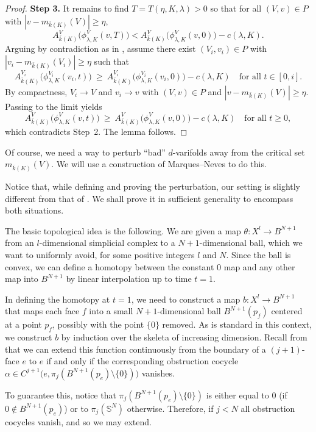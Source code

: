 \documentclass[12pt,english]{article}
\theoremstyle{definition}
\begin{document}
\begin{proof}
\textbf{Step 3.} It remains to find \(T=T(\eta,K,\lambda)>0\) so that for all \((V,v)\in P\) with \(|v-m_{\bar{k}(K)}(V)|\ge \eta\),
\[
A^V_{\bar{k}(K)}\bigl(\phi^V_{\lambda,K}(v,T)\bigr)
<
A^V_{\bar{k}(K)}\bigl(\phi^V_{\lambda,K}(v,0)\bigr)-c(\lambda,K).
\]
Arguing by contradiction as in \cite[Lemma~4.5]{MarquesNeves}, assume there exist \((V_i,v_i)\in P\) with \(|v_i-m_{\bar{k}(K)}(V_i)|\ge \eta\) such that
\[
A^{V_i}_{\bar{k}(K)}\bigl(\phi^{V_i}_{\lambda,K}(v_i,t)\bigr)
\ \ge\
A^{V_i}_{\bar{k}(K)}\bigl(\phi^{V_i}_{\lambda,K}(v_i,0)\bigr)-c(\lambda,K)
\quad\text{for all }t\in[0,i].
\]
By compactness, \(V_i\to V\) and \(v_i\to v\) with \((V,v)\in P\) and \(|v-m_{\bar{k}(K)}(V)|\ge \eta\). Passing to the limit yields
\[
A^{V}_{\bar{k}(K)}\bigl(\phi^{V}_{\lambda,K}(v,t)\bigr)
\ \ge\
A^{V}_{\bar{k}(K)}\bigl(\phi^{V}_{\lambda,K}(v,0)\bigr)-c(\lambda,K)
\quad\text{for all }t\ge 0,
\]
which contradicts Step~2. The lemma follows.
\end{proof}


Of course, we need a way to perturb ``bad'' $d$-varifolds away from the critical set $m_{\bar k (K)}(V)$. We will use a construction of Marques--Neves to do this.

Notice that, while defining and proving the perturbation, our setting is slightly different from that of \cite[Theorem~5.1]{MarquesNeves}. We shall prove it in sufficient generality to encompass both situations.

The basic topological idea is the following. We are given a map $\theta:X^l\rightarrow B^{N+1}$ from an $l$-dimensional simplicial complex to a $N+1$-dimensional ball, which we want to uniformly avoid, for some positive integers $l$ and $N$. Since the ball is convex, we can define a homotopy between the constant $0$ map and any other map into $B^{N+1}$ by linear interpolation up to time $t=1$.

In defining the homotopy at $t=1$, we need to construct a map $b:X^l\rightarrow B^{N+1}$ that maps each face $f$ into a small $N+1$-dimensional ball $B^{N+1}(p_f)$ centered at a point $p_f$, possibly with the  point $\{0\}$ removed. As is standard in this context, we construct $b$ by induction over the skeleta of increasing dimension. Recall from \cite[Theorem~7.1]{DavisKirk} that we can extend this function continuously from the boundary of a $(j+1)$-face $e$ to $e$ if and only if the corresponding obstruction cocycle $\alpha\in C^{j+1}\bigl(e,\pi_j(B^{N+1}(p_e)\setminus\{0\})\bigr)$ vanishes.

To guarantee this, notice that $\pi_j(B^{N+1}(p_e)\setminus\{0\})$ is either equal to $0$ (if $0\not\in B^{N+1}(p_e)$) or to $\pi_j(\mathbb S^{N})$ otherwise. Therefore, if $j<N$ all obstruction cocycles vanish, and so we may extend.
\end{document}
